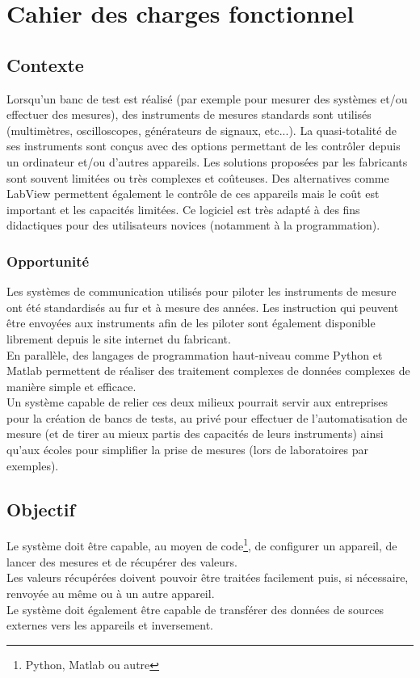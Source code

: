 \documentclass[AdvProjMgmt_Sebastien_Deriaz]{subfiles}
\begin{document}
\section{Cahier des charges fonctionnel}
\subsection{Contexte}
Lorsqu'un banc de test est réalisé (par exemple pour mesurer des systèmes et/ou effectuer des mesures), des instruments de mesures standards sont utilisés (multimètres, oscilloscopes, générateurs de signaux, etc...). La quasi-totalité de ses instruments sont conçus avec des options permettant de les contrôler depuis un ordinateur et/ou d'autres appareils. Les solutions proposées par les fabricants sont souvent limitées ou très complexes et coûteuses. Des alternatives comme LabView permettent également le contrôle de ces appareils mais le coût est important et les capacités limitées. Ce logiciel est très adapté à des fins didactiques pour des utilisateurs novices (notamment à la programmation).
\subsubsection{Opportunité}
Les systèmes de communication utilisés pour piloter les instruments de mesure ont été standardisés au fur et à mesure des années. Les instruction qui peuvent être envoyées aux instruments afin de les piloter sont également disponible librement depuis le site internet du fabricant.\\
En parallèle, des langages de programmation haut-niveau comme Python et Matlab permettent de réaliser des traitement complexes de données complexes de manière simple et efficace.\\
Un système capable de relier ces deux milieux pourrait servir aux entreprises pour la création de bancs de tests, au privé pour effectuer de l'automatisation de mesure (et de tirer au mieux partis des capacités de leurs instruments) ainsi qu'aux écoles pour simplifier la prise de mesures (lors de laboratoires par exemples).
\subsection{Objectif}
Le système doit être capable, au moyen de code\footnote{Python, Matlab ou autre}, de configurer un appareil, de lancer des mesures et de récupérer des valeurs.\\
Les valeurs récupérées doivent pouvoir être traitées facilement puis, si nécessaire, renvoyée au même ou à un autre appareil.\\
Le système doit également être capable de transférer des données de sources externes vers les appareils et inversement.\\
\end{document}
